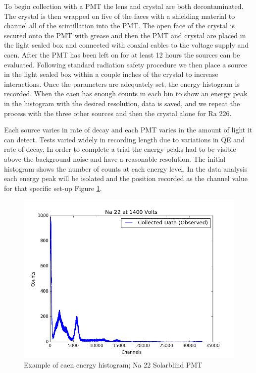 \documentclass[aip, jmp, amssymb, amsmath, reprint, floatfix]{revtex4-1}
\begin{document}
To begin collection with a PMT the lens and crystal are both decontaminated. The crystal is then wrapped on five of the faces with a shielding material to channel all of the scintillation into the PMT. The open face of the crystal is secured onto the PMT with grease and then the PMT and crystal are placed in the light sealed box and connected with coaxial cables to the voltage supply and caen. After the PMT has been left on for at least 12 hours the sources can be evaluated. Following standard radiation safety procedure we then place a source in the light sealed box within a couple inches of the crystal to increase interactions. Once the parameters are adequately set, the energy histogram is recorded. When the caen has enough counts in each bin to show an energy peak in the histogram with the desired resolution, data is saved, and we repeat the process with the three other sources and then the crystal alone for Ra 226. 

Each source varies in rate of decay and each PMT varies in the amount of light it can detect. Tests varied widely in recording length due to variations in QE and rate of decay. In order to complete a trial the energy peaks had to be visible above the background noise and have a reasonable resolution. The initial histogram shows the number of counts at each energy level. In the data analysis each energy peak will be isolated and the position recorded as the channel value for that specific set-up Figure \ref{fig:exhist}. 

\begin{figure}
  \centering
    \includegraphics[width=.8\columnwidth]{na.png}
  \caption{Example of caen energy histogram; Na 22 Solarblind PMT}
  \label{fig:exhist}
\end{figure} 
\end{document}
